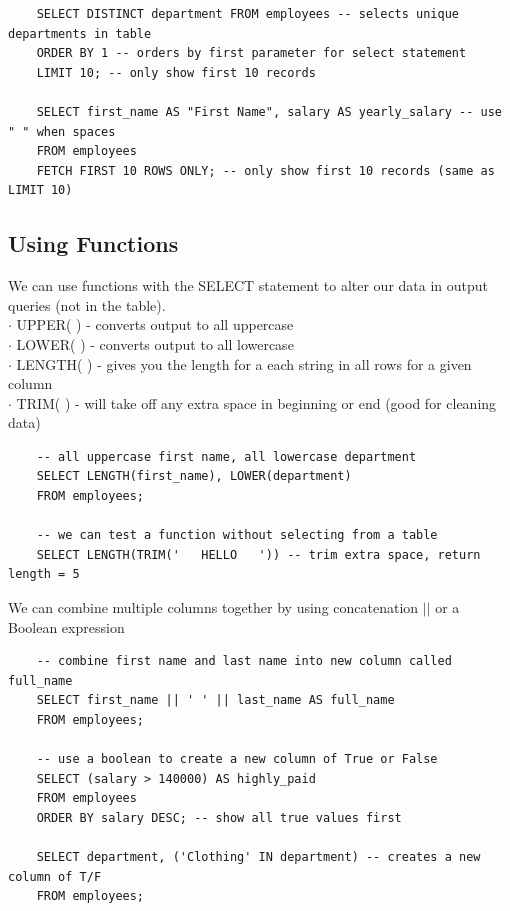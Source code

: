 \documentclass[11pt, a4paper]{article}
\begin{document}
\begin{spacing}{1.1}
\begin{lstlisting}
	SELECT DISTINCT department FROM employees -- selects unique departments in table
	ORDER BY 1 -- orders by first parameter for select statement
	LIMIT 10; -- only show first 10 records
	
	SELECT first_name AS "First Name", salary AS yearly_salary -- use " " when spaces
	FROM employees
	FETCH FIRST 10 ROWS ONLY; -- only show first 10 records (same as LIMIT 10) \end{lstlisting} \vspace*{6mm}
	
	\subsection{Using Functions}
	We can use functions with the SELECT statement to alter our data in output queries (not in the table). \\
	\hspace*{3mm} $\cdot$ UPPER( ) - converts output to all uppercase \\
	\hspace*{3mm} $\cdot$ LOWER( ) - converts output to all lowercase \\
	\hspace*{3mm} $\cdot$ LENGTH( ) - gives you the length for a each string in all rows for a given column \\
	\hspace*{3mm} $\cdot$ TRIM( ) - will take off any extra space in beginning or end (good for cleaning data)
	\begin{lstlisting}
	-- all uppercase first name, all lowercase department
	SELECT LENGTH(first_name), LOWER(department)
	FROM employees; 
	
	-- we can test a function without selecting from a table
	SELECT LENGTH(TRIM('   HELLO   ')) -- trim extra space, return length = 5 \end{lstlisting} \vspace*{1mm}
	We can combine multiple columns together by using concatenation $||$ or a Boolean expression
	\begin{lstlisting}
	-- combine first name and last name into new column called full_name
	SELECT first_name || ' ' || last_name AS full_name
	FROM employees;
	
	-- use a boolean to create a new column of True or False
	SELECT (salary > 140000) AS highly_paid
	FROM employees
	ORDER BY salary DESC; -- show all true values first
	
	SELECT department, ('Clothing' IN department) -- creates a new column of T/F
	FROM employees;  
	

\end{lstlisting}
\end{spacing}
\end{document}
